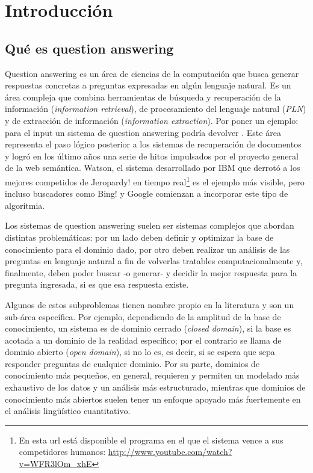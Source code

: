 
\chapter{Introducción}
\label{chap:intro}\label{chap:1}


\section{Qué es question answering}
\label{sec:que-es-qa}

Question answering es un área de ciencias de la computación que busca generar respuestas concretas a preguntas expresadas en algún lenguaje natural. Es un área compleja que combina herramientas de búsqueda y recuperación de la información (\textit{information retrieval}), de procesamiento del lenguaje natural (\textit{PLN}) y de extracción de información (\textit{information extraction}). Por poner un ejemplo: para el input \textit{} un sistema de question answering podría devolver .
Este área representa el paso lógico posterior a los sistemas de recuperación de documentos y logró en los último años una serie de hitos impulsados por el proyecto general de la web semántica. Watson, el sistema desarrollado por IBM que derrotó a los mejores competidos de Jeropardy! en tiempo real\footnote{En esta url está disponible el programa en el que el sistema vence a sus competidores humanos: \url{http://www.youtube.com/watch?v=WFR3lOm_xhE}} es el ejemplo más visible, pero incluso buscadores como Bing! y Google comienzan a incorporar este tipo de algoritmia.

Los sistemas de question answering suelen ser sistemas complejos que abordan distintas problemáticas: por un lado deben definir y optimizar la base de conocimiento para el dominio dado, por otro deben realizar un análisis de las preguntas en lenguaje natural a fin de volverlas
tratables computacionalmente y, finalmente, deben poder buscar -o generar- y decidir la mejor respuesta para la pregunta ingresada, si es que esa respuesta existe.

Algunos de estos subproblemas tienen nombre propio en la literatura y son un sub-área específica. Por ejemplo, dependiendo de la amplitud de la base de conocimiento, un sistema es de dominio cerrado (\textit{closed domain}), si la base es acotada a un dominio de la realidad específico; por el contrario se llama de dominio abierto (\textit{open domain}), si no lo es, es decir, si se espera que sepa responder preguntas de cualquier dominio. Por su parte, dominios de conocimiento más pequeños, en general, requieren y permiten un modelado más exhaustivo
de los datos y un análisis más estructurado, mientras que dominios de conocimiento más abiertos suelen
tener un enfoque apoyado más fuertemente en el análisis lingüístico cuantitativo.

